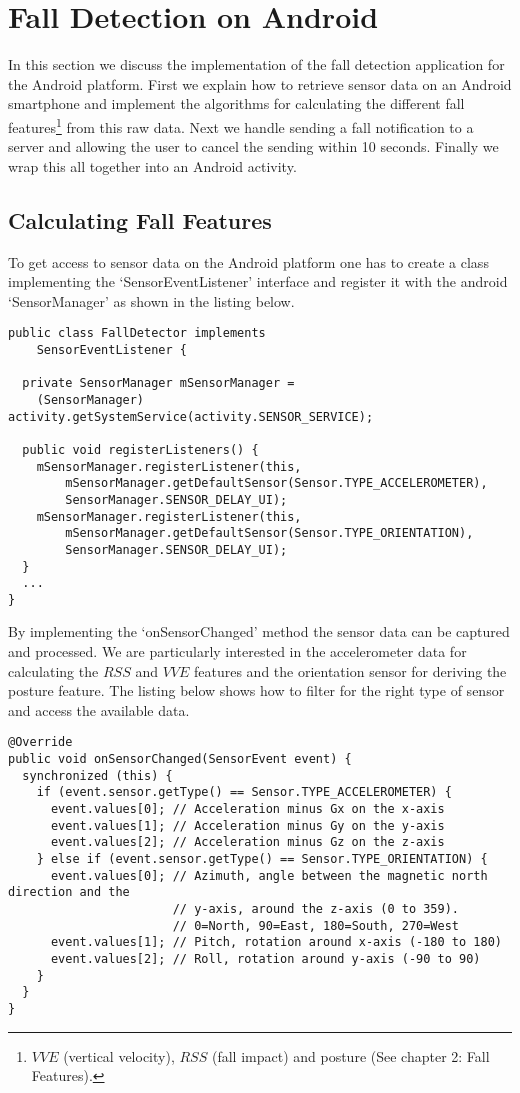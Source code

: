 \documentclass[a4paper, 10pt]{article}
\begin{document}
\section{Fall Detection on Android}
In this section we discuss the implementation of the fall detection application for the Android platform. First we explain how to retrieve sensor data on an Android smartphone and implement the algorithms for calculating the different fall features\footnote{$VVE$ (vertical velocity), $RSS$ (fall impact) and posture (See chapter 2: Fall Features).} from this raw data. Next we handle sending a fall notification to a server and allowing the user to cancel the sending within 10 seconds. Finally we wrap this all together into an Android activity.

\subsection{Calculating Fall Features}
To get access to sensor data on the Android platform one has to create a class implementing the `SensorEventListener' interface and register it with the android `SensorManager' as shown in the listing below.
\begin{lstlisting}
public class FallDetector implements
    SensorEventListener {
    
  private SensorManager mSensorManager = 
    (SensorManager) activity.getSystemService(activity.SENSOR_SERVICE);
    
  public void registerListeners() {
    mSensorManager.registerListener(this,
        mSensorManager.getDefaultSensor(Sensor.TYPE_ACCELEROMETER),
        SensorManager.SENSOR_DELAY_UI);
    mSensorManager.registerListener(this,
        mSensorManager.getDefaultSensor(Sensor.TYPE_ORIENTATION),
        SensorManager.SENSOR_DELAY_UI);
  }  
  ...  
}
\end{lstlisting}
\newpage
By implementing the `onSensorChanged' method the sensor data can be captured and processed. We are particularly interested in the accelerometer data for calculating the $RSS$ and $VVE$ features and the orientation sensor for deriving the posture feature. The listing below shows how to filter for the right type of sensor and access the available data.
\begin{lstlisting}
@Override
public void onSensorChanged(SensorEvent event) {
  synchronized (this) {
    if (event.sensor.getType() == Sensor.TYPE_ACCELEROMETER) {
      event.values[0]; // Acceleration minus Gx on the x-axis
      event.values[1]; // Acceleration minus Gy on the y-axis
      event.values[2]; // Acceleration minus Gz on the z-axis
    } else if (event.sensor.getType() == Sensor.TYPE_ORIENTATION) {      
      event.values[0]; // Azimuth, angle between the magnetic north direction and the
                       // y-axis, around the z-axis (0 to 359). 
                       // 0=North, 90=East, 180=South, 270=West
      event.values[1]; // Pitch, rotation around x-axis (-180 to 180)
      event.values[2]; // Roll, rotation around y-axis (-90 to 90)
    }
  }
}
\end{lstlisting}
\end{document}
